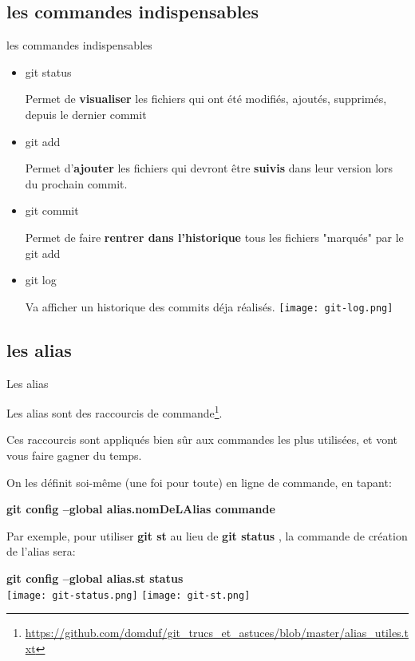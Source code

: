 \documentclass[10pt]{beamer}
\begin{document}
\subsection{les commandes indispensables}

\begin{frame}{les commandes indispensables}
\begin{itemize}
\item git status

Permet de \textbf{visualiser} les fichiers qui ont été modifiés, ajoutés, supprimés, depuis le dernier commit

\item git add

Permet d'\textbf{ajouter} les fichiers qui devront être \textbf{suivis} dans leur version lors du prochain commit.

\item git commit

Permet de faire \textbf{rentrer dans l'historique} tous les fichiers "marqués" par le git add
\item git log

Va afficher un historique des commits déja réalisés.
\texttt{[image: git-log.png]}


\end{itemize}
\end{frame}


\subsection{les alias}
\label{alias}
\begin{frame}{Les alias}

Les alias sont des raccourcis de commande\footnote{\url{https://github.com/domduf/git_trucs_et_astuces/blob/master/alias_utiles.txt}}.

Ces raccourcis sont appliqués bien sûr aux commandes les plus utilisées, et vont vous faire gagner du temps.

On les définit soi-même (une foi pour toute) en ligne de commande, en tapant:

 \textbf{git config --global alias.nomDeLAlias commande} 
 
 \smallbreak
 
Par exemple, pour utiliser \textbf{git st} au lieu de \textbf{git status} , la
commande de création de l'alias sera:

\textbf{git config --global alias.st status}\\

\texttt{[image: git-status.png]} \texttt{[image: git-st.png]}



\end{frame}
\end{document}
